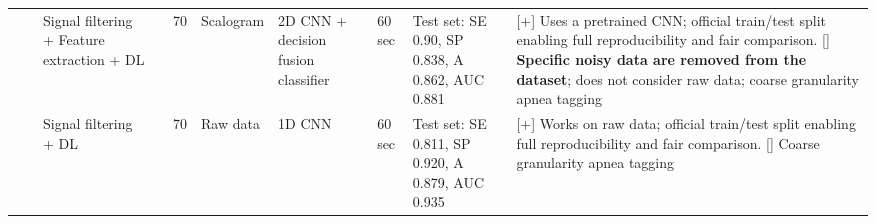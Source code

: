 \documentclass[5p,twocolumn,lefttitle]{elsarticle}
\begin{document}
\begin{table*}[!ht]
{\begin{tabularx}{2\textwidth}{@{}m{2.5em}p{7em}p{10em}lp{2em}p{12em}p{7em}p{3em}p{17em}X@{}}
                            &                                                         & Signal filtering + Feature extraction + DL                     & \cite{singh2019novel}                    & 70            & Scalogram                                                                                                         & 2D CNN + decision fusion classifier & 60 sec                                     & Test set: SE 0.90, SP 0.838, A 0.862, AUC 0.881                                                                                                                                     & [+] Uses a pretrained CNN; official train/test split enabling full reproducibility and fair comparison. [] \textbf{Specific noisy data are removed from the dataset}; does not consider raw data; coarse granularity apnea tagging                                                                                                                                                                                                                                                                                                         \\
                            \cmidrule(l){3-10} 
                            &                                                         & Signal filtering + DL                                          & \cite{DBLP:journals/sensors/ChangYLL20}  & 70            & Raw data                                                                                                          & 1D CNN                              & 60 sec                                     & Test set: SE 0.811, SP 0.920, A 0.879, AUC 0.935                                                                                                                                         & [+] Works on raw data; official train/test split enabling full reproducibility and fair comparison. [] Coarse granularity apnea tagging                                                                                                                                                                                                                                                                                    \\
                            \cmidrule(l){3-10} 

\end{tabularx}}
\end{table*}
\end{document}
